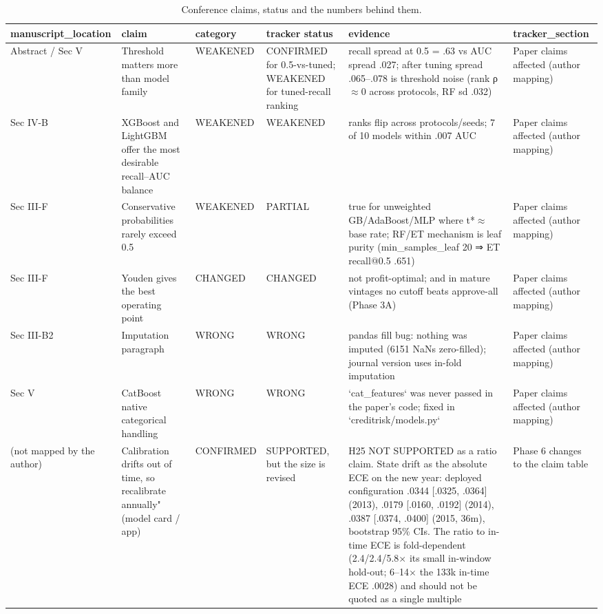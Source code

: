 \begin{table}[t]
\centering
\caption{Conference claims, status and the numbers behind them.}
\label{tab:T15_claims}
\small
\begin{tabular}{lp{5.2cm}lp{5.2cm}p{5.2cm}p{5.2cm}}
\toprule
manuscript\_location & claim & category & tracker status & evidence & tracker\_section \\
\midrule
Abstract / Sec V & Threshold matters more than model family & WEAKENED & CONFIRMED for 0.5-vs-tuned; WEAKENED for tuned-recall ranking & recall spread at 0.5 = .63 vs AUC spread .027; after tuning spread .065--.078 is threshold noise (rank ρ$\approx$0 across protocols, RF sd .032) & Paper claims affected (author mapping) \\
Sec IV-B & XGBoost and LightGBM offer the most desirable recall--AUC balance & WEAKENED & WEAKENED & ranks flip across protocols/seeds; 7 of 10 models within .007 AUC & Paper claims affected (author mapping) \\
Sec III-F & Conservative probabilities rarely exceed 0.5 & WEAKENED & PARTIAL & true for unweighted GB/AdaBoost/MLP where t*$\approx$base rate; RF/ET mechanism is leaf purity (min\_samples\_leaf 20 ⇒ ET recall@0.5 .651) & Paper claims affected (author mapping) \\
Sec III-F & Youden gives the best operating point & CHANGED & CHANGED & not profit-optimal; and in mature vintages no cutoff beats approve-all (Phase 3A) & Paper claims affected (author mapping) \\
Sec III-B2 & Imputation paragraph & WRONG & WRONG & pandas fill bug: nothing was imputed (6151 NaNs zero-filled); journal version uses in-fold imputation & Paper claims affected (author mapping) \\
Sec V & CatBoost native categorical handling & WRONG & WRONG & `cat\_features` was never passed in the paper's code; fixed in `creditrisk/models.py` & Paper claims affected (author mapping) \\
(not mapped by the author) & Calibration drifts out of time, so recalibrate annually" (model card / app) & CONFIRMED & SUPPORTED, but the size is revised & H25 NOT SUPPORTED as a ratio claim. State drift as the absolute ECE on the new year: deployed configuration .0344 [.0325, .0364] (2013), .0179 [.0160, .0192] (2014), .0387 [.0374, .0400] (2015, 36m), bootstrap 95\% CIs. The ratio to in-time ECE is fold-dependent (2.4/2.4/5.8$\times$ its small in-window hold-out; 6--14$\times$ the 133k in-time ECE .0028) and should not be quoted as a single multiple & Phase 6 changes to the claim table \\

\end{tabular}
\end{table}
